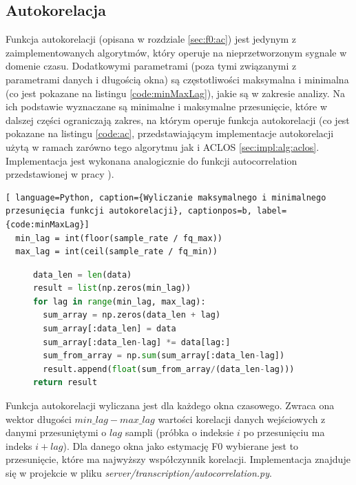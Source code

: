 \documentclass[12pt,a4paper,twoside]{mwart}
\begin{document}
\subsection{Autokorelacja}\label{sec:impl:alg:ac}
Funkcja autokorelacji (opisana w rozdziale \ref{sec:f0:ac}) jest jedynym z zaimplementowanych algorytmów, który operuje na nieprzetworzonym sygnale w domenie czasu. Dodatkowymi parametrami (poza tymi związanymi z parametrami danych i długością okna) są częstotliwości maksymalna i minimalna (co jest pokazane na listingu \ref{code:minMaxLag}), jakie są w zakresie analizy. Na ich podstawie wyznaczane są minimalne i maksymalne przesunięcie, które w dalszej części ograniczają zakres, na którym operuje funkcja autokorelacji (co jest pokazane na listingu \ref{code:ac}, przedstawiającym implementacje autokorelacji użytą w ramach zarówno tego algorytmu jak i ACLOS \ref{sec:impl:alg:aclos}. Implementacja jest wykonana analogicznie do funkcji autocorrelation przedstawionej w pracy \cite[75]{Transcription:Quenneville:Thesis}).
\begin{lstlisting}[ language=Python, caption={Wyliczanie maksymalnego i minimalnego przesunięcia funkcji autokorelacji}, captionpos=b, label={code:minMaxLag}]
  min_lag = int(floor(sample_rate / fq_max))
  max_lag = int(ceil(sample_rate / fq_min))
\end{lstlisting}
\begin{figure}
\begin{lstlisting}[language=Python, caption={Funkcja autokorelacji, zaimplementowana analogicznie do metody przedstawionej w \cite{Transcription:Quenneville:Thesis}}, captionpos=b, label={code:ac}]
data_len = len(data)
result = list(np.zeros(min_lag))
for lag in range(min_lag, max_lag):
  sum_array = np.zeros(data_len + lag)
  sum_array[:data_len] = data
  sum_array[:data_len-lag] *= data[lag:]
  sum_from_array = np.sum(sum_array[:data_len-lag])
  result.append(float(sum_from_array/(data_len-lag)))
return result
\end{lstlisting}
\end{figure}

Funkcja autokorelacji wyliczana jest dla każdego okna czasowego. Zwraca ona wektor długości $min\_lag - max\_lag$ wartości korelacji danych wejściowych z danymi przesuniętymi o $lag$ sampli (próbka o indeksie $i$ po przesunięciu ma indeks $i + lag$). Dla danego okna jako estymację F0 wybierane jest to przesunięcie, które ma najwyższy współczynnik korelacji. Implementacja znajduje się w projekcie w pliku \textit{server/transcription/autocorrelation.py}.
\end{document}
